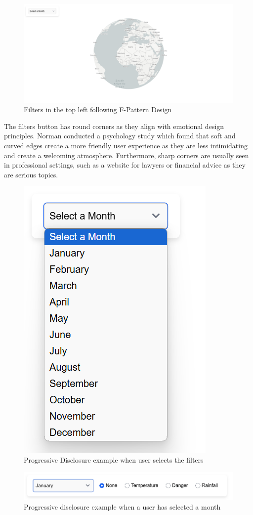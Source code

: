 \documentclass[]{project_final}
\begin{document}
\begin{figure}[ht!]
  \centering
  \includegraphics[width=\textwidth]{1.png}
  \caption{Filters in the top left following F-Pattern Design}
  \label{fig:1}
\end{figure}

The filters button has round corners as they align with emotional design principles. Norman conducted a psychology study which found that soft and curved edges create a more friendly user experience as they are less intimidating and create a welcoming atmosphere.  Furthermore, sharp corners are usually seen in professional settings, such as a website for lawyers or financial advice as they are serious topics.

\begin{figure}[ht!]
  \centering
  \includegraphics[width=.5\textwidth]{2.png}
  \caption{Progressive Disclosure example when user selects the filters}
  \label{fig:1}
\end{figure}

\begin{figure}[ht!]
  \centering
  \includegraphics[width=\textwidth]{3.png}
  \caption{Progressive disclosure example when a user has selected a month}
  \label{fig:1}
\end{figure}
\end{document}
